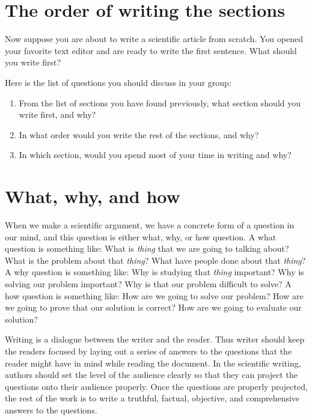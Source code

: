\documentclass{article}
\begin{document}
\newpage
\section{The order of writing the sections}

Now suppose you are about to write a scientific article from scratch.
You opened your favorite text editor and are ready to write the first sentence.
What should you write first?

Here is the list of questions you should discuss in your group:
\begin{enumerate}
    \item From the list of sections you have found previously, what section should you write first, and why?
    \vspace{2in}
    \item In what order would you write the rest of the sections, and why?
    \vspace{2in}
    \item In which section, would you spend most of your time in writing and why?
    \vspace{2in}
\end{enumerate}


\newpage
\section{What, why, and how}

When we make a scientific argument, we have a concrete form of a question in our mind, and this question is either what, why, or how question.
A what question is something like: What is \textit{thing} that we are going to talking about? What is the problem about that \textit{thing}? What have people done about that \textit{thing}?
A why question is something like: Why is studying that \textit{thing} important? Why is solving our problem important? Why is that our problem difficult to solve?
A how question is something like: How are we going to solve our problem? How are we going to prove that our solution is correct? How are we going to evaluate our solution?

Writing is a dialogue between the writer and the reader.
Thus writer should keep the readers focused by laying out a series of answers to the questions that the reader might have in mind while reading the document.
In the scientific writing, authors should set the level of the audience clearly so that they can project the questions onto their audience properly.
Once the questions are properly projected, the rest of the work is to write a truthful, factual, objective, and comprehensive answers to the questions.
\end{document}
